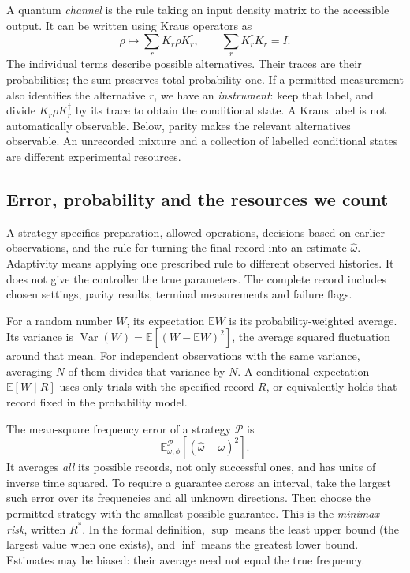 \documentclass[11pt,a4paper]{article}
\numberwithin{equation}{section}
\theoremstyle{remark}
\DeclareMathOperator{\Var}{Var}
\newcommand{\E}{\mathbb E}
\begin{document}
A quantum \emph{channel} is the rule taking an input density matrix to the
accessible output. It can be written using Kraus operators as
\begin{equation}
 \rho\longmapsto\sum_rK_r\rho K_r^\dagger,\qquad
 \sum_rK_r^\dagger K_r=I.
 \label{intro:channel}
\end{equation}
The individual terms describe possible alternatives. Their traces are their
probabilities; the sum preserves total probability one. If a permitted
measurement also identifies the alternative $r$, we have an \emph{instrument}:
keep that label, and divide $K_r\rho K_r^\dagger$ by its trace to obtain
the conditional state. A Kraus label is not automatically observable.
Below, parity makes the relevant alternatives observable. An unrecorded
mixture and a collection of labelled conditional states are different
experimental resources.

\subsection{Error, probability and the resources we count}

A strategy specifies preparation, allowed operations, decisions based on
earlier observations, and the rule for turning the final record into an
estimate $\widehat\omega$. Adaptivity means applying one prescribed rule to
different observed histories. It does not give the controller the true
parameters. The complete record includes chosen settings, parity results,
terminal measurements and failure flags.

For a random number $W$, its expectation $\E W$ is its probability-weighted
average. Its variance is $\Var(W)=\E[(W-\E W)^2]$, the average squared
fluctuation around that mean. For independent observations with the same
variance, averaging $N$ of them divides that variance by $N$.
A conditional expectation $\E[W\mid R]$ uses only trials with the specified
record $R$, or equivalently holds that record fixed in the probability model.

The mean-square frequency error of a strategy $\mathcal P$ is
\begin{equation}
 \E_{\omega,\phi}^{\mathcal P}[(\widehat\omega-\omega)^2].
 \label{intro:mse}
\end{equation}
It averages \emph{all} its possible records, not only successful ones, and
has units of inverse time squared. To require a guarantee across an interval,
take the largest such error over its frequencies and all unknown directions.
Then choose the permitted strategy with the smallest possible guarantee.
This is the \emph{minimax risk}, written $R^*$. In the formal definition,
$\sup$ means the least upper bound (the largest value when one exists), and
$\inf$ means the greatest lower bound. Estimates may be biased: their
average need not equal the true frequency.
\end{document}
